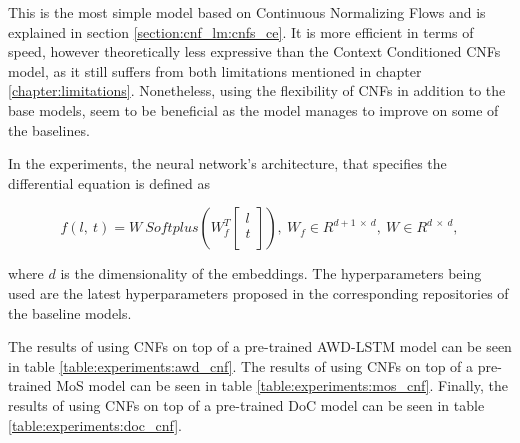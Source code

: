 This is the most simple model based on Continuous Normalizing Flows and is explained in section \ref{section:cnf_lm:cnfs_ce}. It is more efficient in terms of speed, however theoretically less expressive than the Context Conditioned CNFs model, as it still suffers from both limitations mentioned in chapter \ref{chapter:limitations}. Nonetheless, using the flexibility of CNFs in addition to the base models, seem to be beneficial as the model manages to improve on some of the baselines.

In the experiments, the neural network's architecture, that specifies the differential equation is defined as

\begin{displaymath}
    f(l, \ t) = W \ Softplus(W_f^T 
        \begin{bmatrix}
           l \\
           t \\
        \end{bmatrix}),
        \ W_f \in R^{d+1 \ \times \ d}, \ W \in R^{d \ \times \ d},
\end{displaymath}

where $ d $ is the dimensionality of the embeddings. The hyperparameters being used are the latest hyperparameters proposed in the corresponding repositories of the baseline models.

The results of using CNFs on top of a pre-trained AWD-LSTM model can be seen in table \ref{table:experiments:awd_cnf}. The results of using CNFs on top of a pre-trained MoS model can be seen in table \ref{table:experiments:mos_cnf}. Finally, the results of using CNFs on top of a pre-trained DoC model can be seen in table \ref{table:experiments:doc_cnf}.

